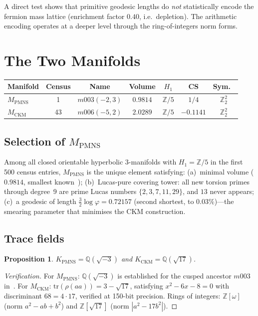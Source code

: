 \documentclass[11pt,a4paper]{article}
\newtheorem{proposition}[theorem]{Proposition}
\theoremstyle{definition}
\theoremstyle{remark}
\newcommand{\Zfive}{\mathbb{Z}/5}
\newcommand{\MPMNS}{M_{\mathrm{PMNS}}}
\newcommand{\MCKM}{M_{\mathrm{CKM}}}
\newcommand{\KPMNS}{K_{\mathrm{PMNS}}}
\newcommand{\KCKM}{K_{\mathrm{CKM}}}
\newcommand{\Zom}{\mathbb{Z}[\omega]}
\newcommand{\Zsev}{\mathbb{Z}[\sqrt{17}]}
\newcommand{\vp}{\varphi}
\begin{document}
A direct test shows that primitive geodesic lengths do \emph{not}
statistically encode the fermion mass lattice (enrichment factor $0.40$,
i.e.\ depletion). The arithmetic encoding operates at a deeper level
through the ring-of-integers norm forms.

\section{The Two Manifolds}
\label{sec:manifolds}

\begin{center}
\begin{tabular}{lcccccc}
\toprule
Manifold & Census & Name & Volume & $H_1$ & CS & Sym.\ \\
\midrule
$\MPMNS$ & 1  & $m003(-2,3)$ & $0.9814$ & $\Zfive$ & $1/4$      & $\mathbb{Z}_2^2$ \\
$\MCKM$  & 43 & $m006(-5,2)$ & $2.0289$ & $\Zfive$ & $-0.1141$ & $\mathbb{Z}_2^2$ \\
\bottomrule
\end{tabular}
\end{center}

\subsection{Selection of $\MPMNS$}

Among all closed orientable hyperbolic 3-manifolds with
$H_1=\Zfive$ in the first 500 census entries, $\MPMNS$ is the unique
element satisfying:
(a)~minimal volume ($0.9814$, smallest known~\cite{GMM});
(b)~Lucas-pure covering tower: all new torsion primes through degree~9
are prime Lucas numbers $\{2,3,7,11,29\}$, and $13$ never appears;
(c)~a geodesic of length $\frac{3}{2}\log\vp=0.72157$ (second shortest,
to $0.03\%$)---the smearing parameter that minimises the CKM construction.

\subsection{Trace fields}

\begin{proposition}
$\KPMNS = \mathbb{Q}(\sqrt{-3})$ and $\KCKM = \mathbb{Q}(\sqrt{17})$.
\end{proposition}
\begin{proof}[Verification]
For $\MPMNS$: $\mathbb{Q}(\sqrt{-3})$ is established for the cusped
ancestor $m003$ in~\cite{Chinburg98}.
For $\MCKM$: $\mathrm{tr}(\rho(aa))=3-\sqrt{17}$, satisfying
$x^2-6x-8=0$ with discriminant $68=4\cdot17$, verified at 150-bit
precision. Rings of integers: $\Zom$ (norm $a^2-ab+b^2$) and
$\Zsev$ (norm $|a^2-17b^2|$).
\end{proof}
\end{document}
